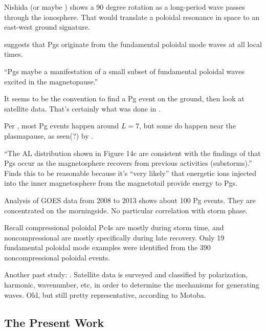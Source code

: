 Nishida\cite{nishida_1964_screening} (or maybe \cite{nishida_1964_impulses}) shows a 90 degree rotation as a long-period \Alfven wave passes through the ionosphere. That would translate a poloidal resonance in space to an east-west ground signature. 

\cite{motoba_2015} suggests that Pgs originate from the fundamental poloidal mode waves at all local times. 

``Pgs maybe a manifestation of a small subset of fundamental poloidal waves excited in the magnetopause.'' \cite{takahashi_2013}

It seems to be the convention to find a Pg event on the ground, then look at satellite data. That's certainly what was done in \cite{motoba_2015}. 

Per \cite{motoba_2015}, most Pg events happen around $L=7$, but some do happen near the plasmapause, as seen(?) by \cite{green_1985}. 

``The AL distribution shown in Figure 14c are consistent with the findings of \cite{rostoker_1979} that Pgs occur as the magnetosphere recovers from previous activities (substorms).''\cite{motoba_2015} Finds this to be reasonable because it's ``very likely'' that energetic ions injected into the inner magnetosphere from the magnetotail provide energy to Pgs. 

Analysis of GOES data from 2008 to 2013 shows about 100 Pg events. They are concentrated on the morningside. No particular correlation with storm phase\cite{motoba_2015}. 

Recall compressional poloidal Pc4s are mostly during storm time, and noncompressional are mostly specifically during late recovery\cite{dai_2015}. Only 19 fundamental poloidal mode examples were identified from the 390 noncompressional poloidal events. 

Another past study: \cite{takahashi_1984}. Satellite data is surveyed and classified by polarization, harmonic, wavenumber, etc, in order to determine the mechanisms for generating \Alfven waves. Old, but still pretty representative, according to Motoba\cite{motoba_2015}. 

\subsection{The Present Work}

